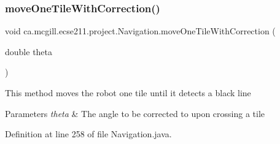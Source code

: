 \subsubsection{\texorpdfstring{move\+One\+Tile\+With\+Correction()}{moveOneTileWithCorrection()}}
{\footnotesize\ttfamily void ca.\+mcgill.\+ecse211.\+project.\+Navigation.\+move\+One\+Tile\+With\+Correction (\begin{DoxyParamCaption}\item[{double}]{theta }\end{DoxyParamCaption})}

This method moves the robot one tile until it detects a black line


\begin{DoxyParams}{Parameters}
{\em theta} & The angle to be corrected to upon crossing a tile \\
\hline
\end{DoxyParams}


Definition at line 258 of file Navigation.\+java.


